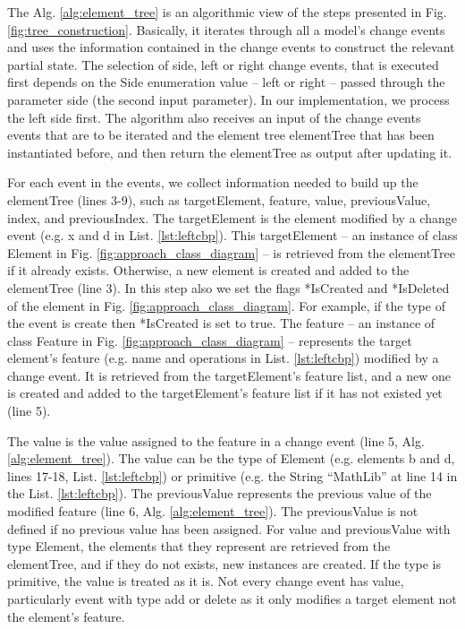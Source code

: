 \documentclass{jot}
\begin{document}
The Alg. \ref{alg:element_tree} is an algorithmic view of the steps presented in Fig. \ref{fig:tree_construction}. Basically, it iterates through all a model's change events and uses the information contained in the change events to construct the relevant partial state. The selection of side, left or right change events, that is executed first depends on the \textsf{Side} enumeration value -- \textsf{left} or \textsf{right} -- passed through the parameter \textsf{side} (the second input parameter). In our implementation, we process the left side first. The algorithm also receives an input of the change events \textsf{events} that are to be iterated and the element tree \textsf{elementTree} that has been instantiated before, and then return the \textsf{elementTree} as output after updating it.

For each \textsf{event} in the \textsf{events}, we collect information needed to build up the \textsf{elementTree}  (lines 3-9), such as \textsf{targetElement}, \textsf{feature}, \textsf{value}, \textsf{previousValue}, \textsf{index}, and \textsf{previousIndex}. The \textsf{targetElement} is the element modified by a change event (e.g. \textsf{x} and \textsf{d} in List. \ref{lst:leftcbp}). This \textsf{targetElement} -- an instance of class Element in Fig. \ref{fig:approach_class_diagram} -- is retrieved from the \textsf{elementTree} if it already exists. Otherwise, a new element is created and added to the \textsf{elementTree} (line 3). In this step also we set the flags \textsf{*IsCreated} and \textsf{*IsDeleted} of the element in Fig. \ref{fig:approach_class_diagram}. For example, if the type of the event is \textsf{create} then \textsf{*IsCreated} is set to \textsf{true}. The \textsf{feature} -- an instance of class Feature in Fig. \ref{fig:approach_class_diagram} -- represents the target element's feature (e.g. \textsf{name} and \textsf{operations} in List. \ref{lst:leftcbp}) modified by a change event. It is  retrieved from the \textsf{targetElement}'s feature list, and a new one is created and added to the \textsf{targetElement}'s feature list if it has not existed yet (line 5). 

The \textsf{value} is the value assigned to the feature in a change event (line 5, Alg. \ref{alg:element_tree}). The \textsf{value} can be the type of \textsf{Element} (e.g. elements \textsf{b} and  \textsf{d}, lines 17-18, List. \ref{lst:leftcbp}) or primitive (e.g. the String ``MathLib'' at line 14 in the List. \ref{lst:leftcbp}). The \textsf{previousValue} represents the previous value of the modified feature (line 6, Alg. \ref{alg:element_tree}). The \textsf{previousValue} is not defined if no previous value has been assigned. For \textsf{value} and \textsf{previousValue} with type \textsf{Element}, the elements that they represent are retrieved from the \textsf{elementTree}, and if they do not exists, new instances are created. If the type is primitive, the value is treated as it is. Not every change event has \textsf{value}, particularly event with type \textsf{add} or \textsf{delete} as it only modifies a target element not the element's feature.
\end{document}

